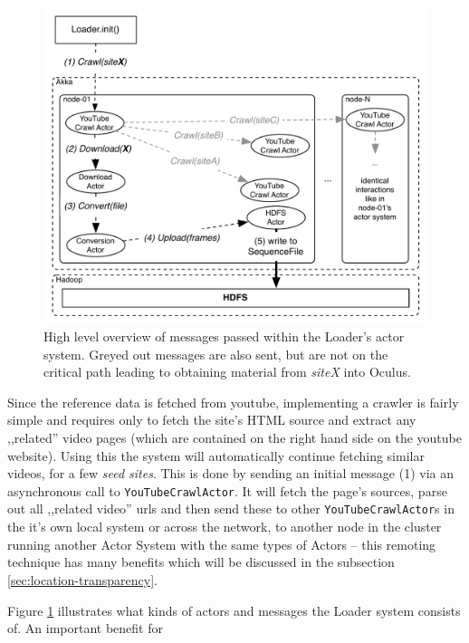 \begin{figure}[ch!]
  \centering
  \includegraphics[scale=0.9]{./diagrams/loader-high-level.pdf}
  \caption{High level overview of messages passed within the Loader's actor system. Greyed out messages are also sent, but are not on the critical path leading to obtaining material from \textit{siteX} into Oculus.}
  \label{fig:high-level-loader}
\end{figure}

Since the reference data is fetched from youtube, implementing a crawler is fairly simple and requires only to fetch the site's HTML source and extract any ,,related'' video pages (which are contained on the right hand side on the youtube website). Using this the system will automatically continue fetching similar videos, for a few \textit{seed sites}. This is done by sending an initial message (1) via an asynchronous call to \verb|YouTubeCrawlActor|. It will fetch the page's sources, parse out all ,,related video'' urls and then send these to other \verb|YouTubeCrawlActor|s in the it's own local system or across the network, to another node in the cluster running another Actor System with the same types of Actors -- this remoting technique has many benefits which will be discussed in the subsection \ref{sec:location-transparency}.

Figure \ref{fig:high-level-loader} illustrates what kinds of actors and messages the Loader system consists of.
An important benefit for 



